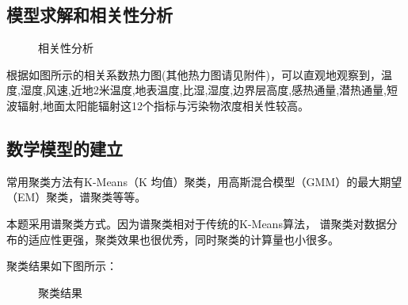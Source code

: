 \documentclass[a4paper,10pt]{my_paper}
\numberwithin{equation}{section}
\begin{document}
\subsection{模型求解和相关性分析}
\begin{figure}[htbp]
  \caption{相关性分析}\label{fig_相关性分析}
\end{figure}

根据如图所示的相关系数热力图(其他热力图请见附件)，可以直观地观察到，温度,湿度,风速,近地2米温度,地表温度,比湿,湿度,边界层高度,感热通量,潜热通量,短波辐射,地面太阳能辐射这12个指标与污染物浓度相关性较高。

\subsection{数学模型的建立}
常用聚类方法有K-Means（K 均值）聚类，用高斯混合模型（GMM）的最大期望（EM）聚类，谱聚类等等。

本题采用谱聚类方式。因为谱聚类相对于传统的K-Means算法， 谱聚类对数据分布的适应性更强，聚类效果也很优秀，同时聚类的计算量也小很多。

聚类结果如下图所示：

\begin{figure}[htb]
    \caption{聚类结果}\label{fig_聚类结果}
\end{figure}
\end{document}
